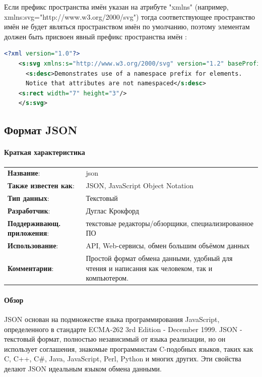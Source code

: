 Если префикс пространства имён указан на атрибуте "xmlns" (например, xmlns:svg="http://www.w3.org/2000/svg") тогда соответствующее пространство имён не будет являться пространством имён по умолчанию, поэтому элементам должен быть присвоен явный префикс пространства имён \cite{andersson2008scalable}:
\begin{lstlisting}[language=XML,label=list:xml]
	<?xml version="1.0"?>
	<s:svg xmlns:s="http://www.w3.org/2000/svg" version="1.2" baseProfile="tiny">
	  <s:desc>Demonstrates use of a namespace prefix for elements.
	  Notice that attributes are not namespaced</s:desc>
	<s:rect width="7" height="3"/>
	</s:svg>
\end{lstlisting}

\subsection{Формат JSON} \label{subs:json}
\paragraph{Краткая характеристика}

\begin{longtable}{p{110pt} p{340pt}}
	\label{tab:svg}
	\centering
	\textbf{Название}:&json\\
	\textbf{Также известен как}:&JSON, JavaScript Object Notation\\
	\textbf{Тип данных}:&Текстовый\\
	\textbf{Разработчик}:&Дуглас Крокфорд\\
	\textbf{Поддерживающ. приложения}:&текстовые редакторы/обзорщики, специализированное ПО\\
	\textbf{Использование}:&API, Web-сервисы, обмен большим объёмом данных\\
	\textbf{Комментарии}:&Простой формат обмена данными, удобный для чтения и написания как человеком, так и компьютером.\\
\end{longtable}

\paragraph{Обзор}
JSON основан на подмножестве языка программирования JavaScript, определенного в стандарте ECMA-262 3rd Edition - December 1999. JSON - текстовый формат, полностью независимый от языка реализации, но он использует соглашения, знакомые программистам C-подобных языков, таких как C, C++, C\#, Java, JavaScript, Perl, Python и многих других. Эти свойства делают JSON идеальным языком обмена данными.

